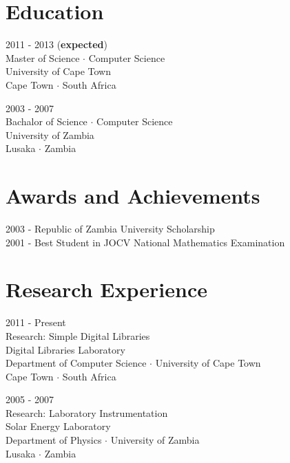 \documentclass[letterpaper]{article}
\renewenvironment{itemize}{
  \begin{list}{}{
    \setlength{\leftmargin}{1.5em}
  }
}{
  \end{list}
}
\begin{document}
\section*{Education}

\begin{itemize}
  \item 2011 - 2013 ({\bf expected}) \\
  Master of Science $\cdot$ Computer Science \\
  University of Cape Town \\
  Cape Town $\cdot$ South Africa

  \item 2003 - 2007 \\
  Bachalor of Science $\cdot$ Computer Science \\
  University of Zambia \\
  Lusaka $\cdot$ Zambia
\end{itemize}


\section*{Awards and Achievements}
\begin{itemize}
 \item 2003 - Republic of Zambia University Scholarship \\
 2001 - Best Student in JOCV National Mathematics Examination
\end{itemize}

\section*{Research Experience}

\begin{itemize}
\item 2011 - Present \\
Research: Simple Digital Libraries \\
Digital Libraries Laboratory \\
Department of Computer Science $\cdot$ University of Cape Town \\
Cape Town $\cdot$ South Africa

\item 2005 - 2007 \\
Research: Laboratory Instrumentation \\
Solar Energy Laboratory \\
Department of Physics $\cdot$ University of Zambia \\
Lusaka $\cdot$ Zambia
\end{itemize}
\end{document}
